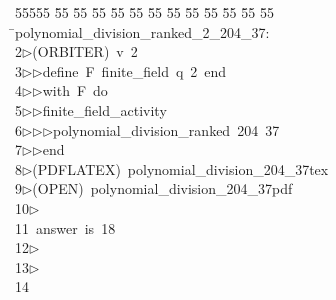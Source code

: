 %
%
\begin{tabbing}
55555 \= 55 \= 55 \= 55 \= 55 \= 55 \= 55 \= 55 \= 55 \= 55 \= 55 \= 55 \= 55 \= \>polynomial\_division\_ranked\_2\_204\_37:\\[0pt]
2\>$\triangleright$\>(ORBITER)\ v\ 2\ \\[0pt]
3\>$\triangleright$\>$\triangleright$\>define\ F\ finite\_field\ q\ 2\ end\ \\[0pt]
4\>$\triangleright$\>$\triangleright$\>with\ F\ do\ \\[0pt]
5\>$\triangleright$\>$\triangleright$\>finite\_field\_activity\ \\[0pt]
6\>$\triangleright$\>$\triangleright$\>$\triangleright$\>polynomial\_division\_ranked\ 204\ 37\ \\[0pt]
7\>$\triangleright$\>$\triangleright$\>end\\[0pt]
8\>$\triangleright$\>(PDFLATEX)\ polynomial\_division\_204\_37tex\\[0pt]
9\>$\triangleright$\>(OPEN)\ polynomial\_division\_204\_37pdf\\[0pt]
10\>$\triangleright$\>\\[0pt]
11\>\ answer\ is\ 18\\[0pt]
12\>$\triangleright$\>\\[0pt]
13\>$\triangleright$\>\\[0pt]
14\>\end{tabbing}
